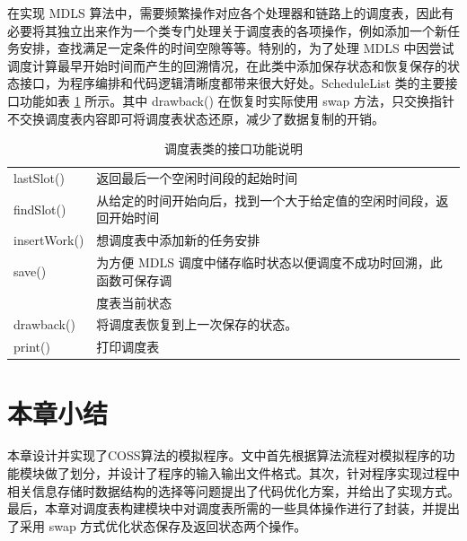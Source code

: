 在实现 MDLS 算法中，需要频繁操作对应各个处理器和链路上的调度表，因此有必要将其独立出来作为一个类专门处理关于调度表的各项操作，例如添加一个新任务安排，查找满足一定条件的时间空隙等等。特别的，为了处理 MDLS 中因尝试调度计算最早开始时间而产生的回溯情况，在此类中添加保存状态和恢复保存的状态接口，为程序编排和代码逻辑清晰度都带来很大好处。ScheduleList 类的主要接口功能如表 \ref{program-tab-SchList-mem} 所示。其中 drawback() 在恢复时实际使用 swap 方法，只交换指针不交换调度表内容即可将调度表状态还原，减少了数据复制的开销。

{\renewcommand{\arraystretch}{1.5}
\begin{table}
  \centering
  \caption{调度表类的接口功能说明}
  \label{program-tab-SchList-mem}
  \begin{tabular}{l|l}
    \hline
    lastSlot() & 返回最后一个空闲时间段的起始时间 \\
    findSlot() & 从给定的时间开始向后，找到一个大于给定值的空闲时间段，返回开始时间 \\
    insertWork() & 想调度表中添加新的任务安排\\
    \hline
    save() & 为方便 MDLS 调度中储存临时状态以便调度不成功时回溯，此函数可保存调\\
           & 度表当前状态 \\
    drawback() & 将调度表恢复到上一次保存的状态。\\
    \hline
    print() & 打印调度表\\
    \hline
  \end{tabular}
\end{table}
}


\section{本章小结}

本章设计并实现了COSS算法的模拟程序。文中首先根据算法流程对模拟程序的功能模块做了划分，并设计了程序的输入输出文件格式。其次，针对程序实现过程中相关信息存储时数据结构的选择等问题提出了代码优化方案，并给出了实现方式。最后，本章对调度表构建模块中对调度表所需的一些具体操作进行了封装，并提出了采用 swap 方式优化状态保存及返回状态两个操作。

